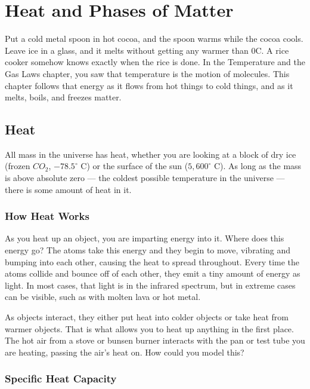 \chapter{Heat and Phases of Matter}

Put a cold metal spoon in hot cocoa, and the spoon warms while the cocoa cools. Leave ice in a glass, and
it melts without getting any warmer than 0\textdegree C. A rice cooker somehow knows exactly when the rice is
done. In the Temperature and the Gas Laws chapter, you saw that temperature is the motion of molecules. This
chapter follows that energy as it flows from hot things to cold things, and as it melts, boils, and freezes
matter.

\section{Heat}\label{chap:heat}
All mass in the universe has heat, whether you are looking at a block of dry ice (frozen $CO_2$, $-78.5^\circ$ C)
or the surface of the sun ($5,600^\circ$ C). As long as the mass is above absolute zero --- the coldest possible
temperature in the universe --- there is some amount of heat in it.

\subsection{How Heat Works}

As you heat up an object, you are imparting energy into it. Where does this energy go? The atoms take this energy
and they begin to move, vibrating and bumping into each other, causing the heat to spread throughout. Every time the
atoms collide and bounce off of each other, they emit a tiny amount of energy as light. In most cases, that light is
in the infrared spectrum, but in extreme cases can be visible, such as with molten lava or hot metal.

As objects interact, they either put heat into colder objects or take heat from warmer objects. That is what allows you to heat up
anything in the first place. The hot air from a stove or bunsen burner interacts with the pan or test tube you are heating,
passing the air's heat on. How could you model this?

\subsection{Specific Heat Capacity}

